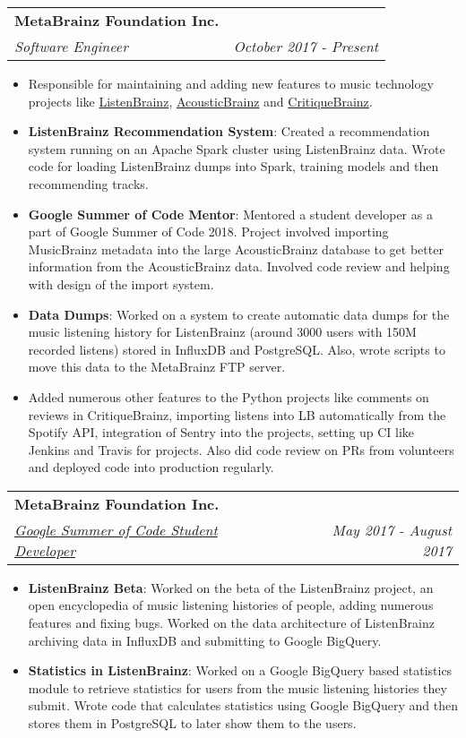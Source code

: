 \documentclass[letterpaper,11pt]{article}
\makeatletter
\newcommand{\resumeItem}[2]{
  \item\small{
    \textbf{#1}{: #2 \vspace{-2pt}}
  }
}
\newcommand{\resumeItemNoHeading}[1]{
  \item\small{
    {#1 \vspace{-2pt}}
  }
}
\newcommand{\resumeSubheading}[4]{
  \vspace{-1pt}\item
    \begin{tabular*}{0.97\textwidth}{l@{\extracolsep{\fill}}r}
      \textbf{#1} & #2 \\
      \textit{\small#3} & \textit{\small #4} \\
    \end{tabular*}\vspace{-5pt}
}
\newcommand{\resumeItemListStart}{\begin{itemize}}
\newcommand{\resumeItemListEnd}{\end{itemize}\vspace{-5pt}}
\makeatother
\begin{document}
    \resumeSubheading
      {MetaBrainz Foundation Inc.}{}
      {Software Engineer}{October 2017 - Present}
      \resumeItemListStart
        \resumeItemNoHeading{Responsible for maintaining and adding new features to music technology projects like \href{https://listenbrainz.org}{ListenBrainz}, \href{https://acousticbrainz.org}{AcousticBrainz} and \href{https://critiquebrainz.org}{CritiqueBrainz}.}
        \resumeItem{ListenBrainz Recommendation System}{Created a recommendation system running on an Apache Spark cluster using ListenBrainz data. Wrote code for loading ListenBrainz dumps into Spark, training models and then recommending tracks.}
        \resumeItem{Google Summer of Code Mentor}{Mentored a student developer as a part of Google Summer of Code 2018. Project involved importing MusicBrainz metadata into the large AcousticBrainz database to get better information from the AcousticBrainz data. Involved code review and helping with design of the import system.}
        \resumeItem{Data Dumps}{Worked on a system to create automatic data dumps for the music listening history for ListenBrainz (around 3000 users with 150M recorded listens) stored in InfluxDB and PostgreSQL. Also, wrote scripts to move this data to the MetaBrainz FTP server.}
       \resumeItemNoHeading{Added numerous other features to the Python projects like comments on reviews in CritiqueBrainz, importing listens into LB automatically from the Spotify API, integration of Sentry into the projects, setting up CI like Jenkins and Travis for projects. Also did code review on PRs from volunteers and deployed code into production regularly.}
      \resumeItemListEnd

    \resumeSubheading
      {MetaBrainz Foundation Inc.}{}
      {\href{https://summerofcode.withgoogle.com/projects/\#6609129159262208}{Google Summer of Code Student Developer}}{May 2017 - August 2017}
      \resumeItemListStart
        \resumeItem{ListenBrainz Beta}
          {Worked on the beta of the ListenBrainz project, an open encyclopedia of music listening histories of people, adding numerous features and fixing bugs. Worked on the data architecture of ListenBrainz archiving data in InfluxDB and submitting to Google BigQuery.}
        \resumeItem{Statistics in ListenBrainz}
          {Worked on a Google BigQuery based statistics module to retrieve statistics for users from the music listening histories they submit. Wrote code that calculates statistics using Google BigQuery and then stores them in PostgreSQL to later show them to the users.}
      \resumeItemListEnd
\end{document}
